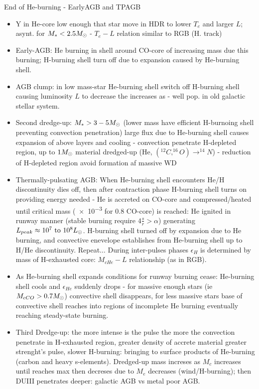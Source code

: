 \begin{frame}{End of He-burning - EarlyAGB and TPAGB}
    \begin{itemize}
        \item Y in He-core low enough that star move in HDR to lower $T_e$ and larger $L$; asynt. for $M_*<2.5M_{\odot}{}$ - $T_e-L$ relation similar to RGB (H. track)
        \item Early-AGB: He burning in shell around CO-core of increasing mass due this burning; H-burning shell turn off due to expansion caused by He-burning shell.
        \item AGB clump: in low mass-star He-burning shell switch off H-burning shell causing luminosity $L$ to decrease the increases as  - well pop. in old galactic stellar system.
        \item Second dredge-up: $M_*>3-5M_{\odot}{}$ (lower mass have efficient H-burnoing shell preventing convection penetration) large flux due to He-burning shell causes expansion of above layers and cooling - convection penetrate H-depleted region, up to $1M_{\odot}{}$ material dredged-up (He, $(^{12}C,^{16}O)\to^{14}N$) - reduction of H-depleted region avoid formation af massive WD
        \item Thermally-pulsating AGB: When He-burning shell encounters He/H discontinuity dies off, then after contraction phase H-burning shell turns on providing energy needed - He is accreted on CO-core and compressed/heated until critical mass (\SI{e-3}{\solarmass} for \SI{0.8}{\solarmass} CO-core) is reached: He ignited in runway manner (stable burning require $4 \frac{s}{r}>\alpha$) generating $L_{peak}\approx\numrange{e7}{e8}\lsun{}$. H-burning shell turned off by expansion due to He burning, and convective enevelope establishes from He-burning shell up to H/He discontinuity. Repeat$\ldots$ During inter-pulses phases $\epsilon_H$ is determined by mass of H-exhausted core: $M_{cHe}-L$ relationship (as in RGB).
        \item As He-burning shell expands conditions for runway burning cease: He-burning shell cools and $\epsilon_{He}$ suddenly drops - for massive enough stars (ie $M_{cCO}>0.7M_{\odot}{}$) convective shell disappears, for less massive stars base of convective shell reaches into regions of incomplete He burning eventually reaching steady-state burning.
        \item Third Dredge-up: the more intense is the pulse the more the convection penetrate in H-exhausted region, greater density of accrete material greater strenght's pulse, slower H-burning: bringing to surface products of He-burning (carbon and heavy s-elements). Dredged-up mass increses as $M_c$ increases until reaches max then decreses due to $M_e$ decreases (wind/H-burning);  then DUIII penetrates deeper: galactic AGB vs metal poor AGB.
        \end{itemize}
\end{frame}

